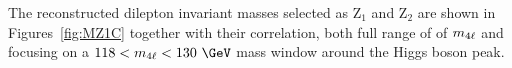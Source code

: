 {%


The reconstructed dilepton invariant masses selected as Z$_1$ and Z$_2$ are shown in Figures~\ref{fig:MZ1C} together with their correlation, both full range of of $m_{4\ell}$ and focusing on a $118<\mllll<130~\GeV$ mass window around the Higgs boson peak.

}
